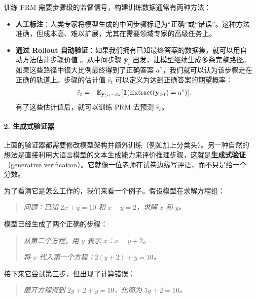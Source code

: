 训练 PRM 需要步骤级的监督信号，构建训练数据通常有两种方法：

\begin{itemize}
\item \textbf{人工标注}：人类专家将模型生成的中间步骤标记为“正确”或“错误”。这种方法准确，但成本高、难以扩展，尤其在需要领域专家的高级任务上。
\item \textbf{通过 Rollout 自动验证}：如果我们拥有已知最终答案的数据集，就可以用自动方法估计步骤价值 \cite{wang-etal:2024math}。从中间步骤 $\bar{\mathbf{y}}_t$ 出发，让模型继续生成多条完整路径。如果这些路径中很大比例最终得到了正确答案 $a^*$，我们就可以认为该步骤走在正确的轨道上。步骤的估计值 $\hat{r}_t$ 可以定义为达到正确答案的期望概率：
    \begin{eqnarray}
    \hat{r}_t & = & \mathbb{E}_{\mathbf{y}_{>t} \sim \pi_\theta} [ \mathbbm{1}(\mathrm{Extract}(\mathbf{y}_{>t}) = a^*) ].
    \end{eqnarray}
    有了这些估计值后，就可以训练 PRM 去预测 $\hat{r}_t$。
\end{itemize}

\paragraph{2. 生成式验证器}

上面的验证器都需要修改模型架构并额外训练（例如加上分类头）。另一种自然的想法是直接利用大语言模型的文本生成能力来评价推理步骤，这就是\textbf{生成式验证}（generative verification）\cite{zheng-etal:2023judging}。它就像一位老师在试卷边缘写评语，而不只是给一个分数。

为了看清它是怎么工作的，我们来看一个例子。假设模型在求解方程组：
\vspace{0.5em}
\begin{quote}
\textit{问题：已知 $2x + y = 10$ 和 $x - y = 2$，求解 $x$ 和 $y$。}
\end{quote}
\vspace{0.5em}

模型已经生成了两个正确的步骤：
\vspace{0.5em}
\begin{quote}
\textit{从第二个方程，用 $y$ 表示 $x$：$x = y + 2$。}

\textit{将 $x$ 代入第一个方程：$2(y + 2) + y = 10$。}
\end{quote}
\vspace{0.5em}

接下来它尝试第三步，但出现了计算错误：
\vspace{0.5em}
\begin{quote}
\textit{展开方程得到 $2y + 2 + y = 10$，化简为 $3y + 2 = 10$。}
\end{quote}
\vspace{0.5em}

